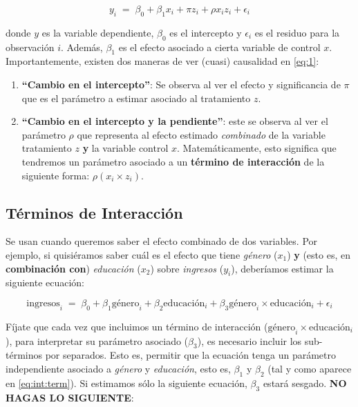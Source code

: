 \documentclass[10pt]{article}
\begin{document}
\begin{equation}\label{eq:1}
y_{i} \;=\; \beta_{0} + \beta_{1}x_{i} + \pi z_{i} + \rho x_{i}z_{i} + \epsilon_{i}
\end{equation}

donde $y$ es la variable dependiente, $\beta_{0}$ es el intercepto y $\epsilon_{i}$ es el residuo para la observaci\'on $i$. Adem\'as, $\beta_{1}$ es el efecto asociado a cierta variable de control $x$. Importantemente, existen dos maneras de ver (cuasi) causalidad en \autoref{eq:1}:

\begin{enumerate}
	\item {\bf ``Cambio en el intercepto''}: Se observa al ver el efecto y significancia de $\pi$ que es el par\'ametro a estimar asociado al tratamiento $z$.

	\item  {\bf ``Cambio en el intercepto y la pendiente''}: este se observa al ver el par\'ametro $\rho$ que representa al efecto estimado \emph{combinado} de la variable tratamiento $z$ {\bf y} la variable control $x$. Matem\'aticamente, esto significa que tendremos un par\'ametro asociado a un {\bf t\'ermino de interacci\'on} de la siguiente forma: $\rho(x_{i}\times z_{i})$. 
\end{enumerate}

\subsection*{T\'erminos de Interacci\'on}

Se usan cuando queremos saber el efecto combinado de dos variables. Por ejemplo, si quisi\'eramos saber cu\'al es el efecto que tiene \emph{g\'enero} ($x_{1}$) {\bf y} (esto es, en {\bf combinaci\'on con}) \emph{educaci\'on} ($x_{2}$) sobre \emph{ingresos} ($y_{i}$), deber\'iamos estimar la siguiente ecuaci\'on:

		\begin{equation}\label{eq:int:term}
			\text{ingresos}_{i} \;=\; \beta_{0} + \beta_{1}\text{g\'enero}_{i} + \beta_{2}\text{educaci\'on}_{i} + \beta_{3}{\text{g\'enero}}_{i}\times \text{educaci\'on}_{i} + \epsilon_{i}
		\end{equation}

F\'ijate que cada vez que incluimos un t\'ermino de interacci\'on (${\text{g\'enero}}_{i}\times \text{educaci\'on}_{i}$), para interpretar su par\'ametro asociado ($\beta_{3}$), es necesario incluir los sub-t\'erminos por separados. Esto es, permitir que la ecuaci\'on tenga un par\'ametro independiente asociado a \emph{g\'enero} y \emph{educaci\'on}, esto es, $\beta_{1}$ y $\beta_{2}$ (tal y como aparece en \autoref{eq:int:term}). Si estimamos s\'olo la siguiente ecuaci\'on, $\beta_{3}$ estar\'a sesgado. {\bf NO HAGAS LO SIGUIENTE}:
\end{document}

